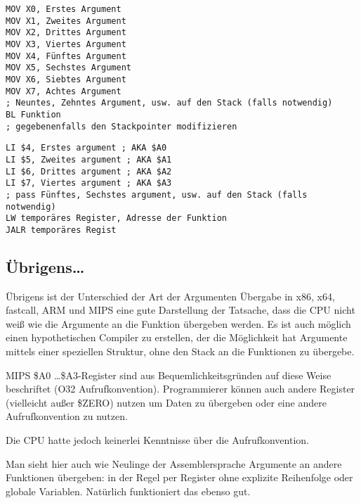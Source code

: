 \begin{lstlisting}[caption=ARM64,style=customasmARM]
MOV X0, Erstes Argument
MOV X1, Zweites Argument
MOV X2, Drittes Argument
MOV X3, Viertes Argument
MOV X4, Fünftes Argument
MOV X5, Sechstes Argument
MOV X6, Siebtes Argument
MOV X7, Achtes Argument
; Neuntes, Zehntes Argument, usw. auf den Stack (falls notwendig)
BL Funktion
; gegebenenfalls den Stackpointer modifizieren
\end{lstlisting}

\begin{lstlisting}[caption=MIPS (O32 calling convention),style=customasmMIPS]
LI $4, Erstes argument ; AKA $A0
LI $5, Zweites argument ; AKA $A1
LI $6, Drittes argument ; AKA $A2
LI $7, Viertes argument ; AKA $A3
; pass Fünftes, Sechstes argument, usw. auf den Stack (falls notwendig)
LW temporäres Register, Adresse der Funktion
JALR temporäres Regist
\end{lstlisting}

\subsection{Übrigens\dots{}}

Übrigens ist der Unterschied der Art der Argumenten Übergabe in x86, x64, fastcall, ARM und MIPS eine gute
Darstellung der Tatsache, dass die CPU nicht weiß wie die Argumente an die Funktion übergeben werden.
Es ist auch möglich einen hypothetischen Compiler zu erstellen, der die Möglichkeit hat Argumente mittels
einer speziellen Struktur, ohne den Stack an die Funktionen zu übergebe.

MIPS \$A0 \dots \$A3-Register sind aus Bequemlichkeitsgründen auf diese Weise beschriftet (O32 Aufrufkonvention).
Programmierer können auch andere Register (vielleicht außer \$ZERO) nutzen um Daten zu übergeben
oder eine andere Aufrufkonvention zu nutzen.

Die \ac{CPU} hatte jedoch keinerlei Kenntnisse über die Aufrufkonvention.

Man sieht hier auch wie Neulinge der Assemblersprache Argumente an andere Funktionen übergeben:
in der Regel per Register ohne explizite Reihenfolge oder globale Variablen.
Natürlich funktioniert das ebenso gut.
